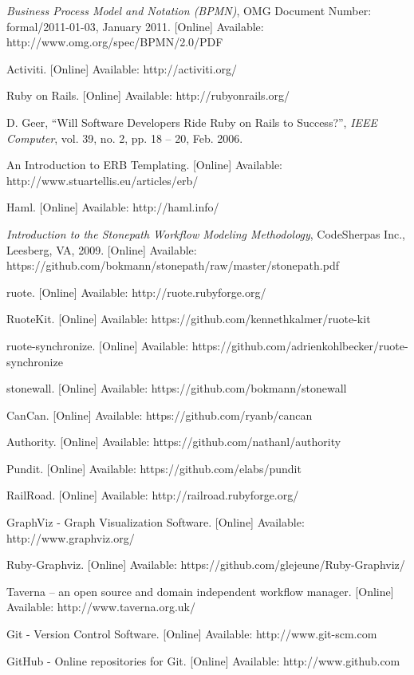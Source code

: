 \renewcommand{\bibname}{References}
\begin{thebibliography}{99}

\textit{Business Process Model and Notation
(BPMN)}, OMG Document Number: formal/2011-01-03, January 2011. [Online] Available: http://www.omg.org/spec/BPMN/2.0/PDF

Activiti. [Online] Available: http://activiti.org/

Ruby on Rails. [Online] Available: http://rubyonrails.org/

D. Geer, ``Will Software Developers Ride Ruby on Rails to Success?'', \textit{IEEE Computer}, vol. 39, no. 2, pp. 18 -- 20, Feb. 2006.

An Introduction to ERB Templating. [Online] Available: http://www.stuartellis.eu/articles/erb/

Haml. [Online] Available: http://haml.info/

\textit{Introduction to the Stonepath Workflow Modeling Methodology},
CodeSherpas Inc., Leesberg, VA, 2009. [Online] Available: https://github.com/bokmann/stonepath/raw/master/stonepath.pdf

ruote. [Online] Available: http://ruote.rubyforge.org/

RuoteKit. [Online] Available: https://github.com/kennethkalmer/ruote-kit

ruote-synchronize. [Online] Available: https://github.com/adrienkohlbecker/ruote-synchronize

stonewall. [Online] Available: https://github.com/bokmann/stonewall

CanCan. [Online] Available: https://github.com/ryanb/cancan

Authority. [Online] Available: https://github.com/nathanl/authority

Pundit. [Online] Available: https://github.com/elabs/pundit

RailRoad. [Online] Available: http://railroad.rubyforge.org/

GraphViz - Graph Visualization Software. [Online] Available: http://www.graphviz.org/

Ruby-Graphviz. [Online] Available: https://github.com/glejeune/Ruby-Graphviz/

Taverna -- an open source and domain independent workflow manager. [Online] Available: http://www.taverna.org.uk/

Git - Version Control Software. [Online] Available: http://www.git-scm.com

GitHub - Online repositories for Git. [Online] Available: http://www.github.com

\end{thebibliography}

%    
%    


